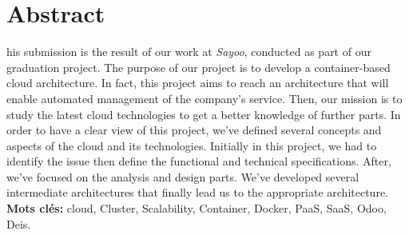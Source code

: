 
\chapter*{Abstract}

\begin{singlespace}
his submission is the result of our work at \emph{Sayoo}, conducted as part of our graduation project. The purpose of our project is to develop a container-based cloud architecture. 
\newline
\newline
In fact, this project aims to reach an architecture that will enable automated management of the company's service. Then, our mission is to study the latest cloud technologies to get a better knowledge of further parts.
\noindent In order to have a clear view of this project, we've defined several concepts and aspects of the cloud and its technologies.
\newline
\newline
Initially in this project, we had to identify the issue then define the functional and technical specifications. After, we've focused on the analysis and design parts. We've developed several intermediate architectures that finally lead us to the appropriate architecture.
\vfill{\textbf{Mots clés:} cloud, Cluster, Scalability, Container, Docker, PaaS, SaaS, Odoo, Deis.}
\end{singlespace}